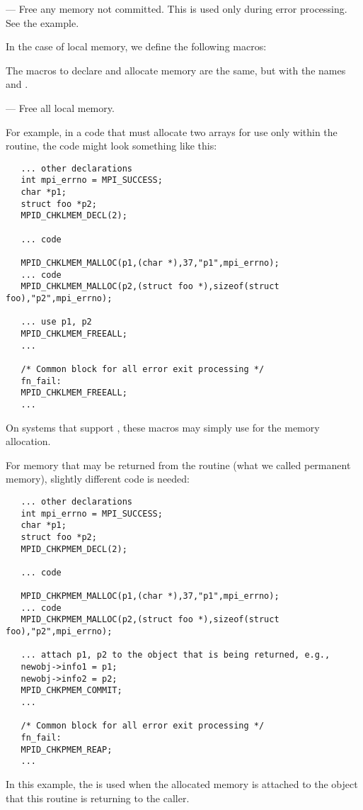\documentclass{article}
\begin{document}
 --- Free any memory not committed.  This is used only
during error processing.  See the example.


In the case of local memory, we define the following macros:

The macros to declare and allocate memory are the same, but with the names
 and . 


 --- Free all local memory.

For example, in a code that must allocate two arrays for use only within the 
routine, the code might look something like this:
\begin{verbatim}
   ... other declarations
   int mpi_errno = MPI_SUCCESS;
   char *p1;  
   struct foo *p2;
   MPID_CHKLMEM_DECL(2);

   ... code

   MPID_CHKLMEM_MALLOC(p1,(char *),37,"p1",mpi_errno);
   ... code
   MPID_CHKLMEM_MALLOC(p2,(struct foo *),sizeof(struct foo),"p2",mpi_errno);

   ... use p1, p2
   MPID_CHKLMEM_FREEALL;
   ...

   /* Common block for all error exit processing */
   fn_fail:
   MPID_CHKLMEM_FREEALL;
   ...
\end{verbatim}
On systems that support , these macros may simply use
 for the memory allocation.

For memory that may be returned from the routine (what we called permanent
memory), slightly different code is needed:
\begin{verbatim}
   ... other declarations
   int mpi_errno = MPI_SUCCESS;
   char *p1;  
   struct foo *p2;
   MPID_CHKPMEM_DECL(2);

   ... code

   MPID_CHKPMEM_MALLOC(p1,(char *),37,"p1",mpi_errno);
   ... code
   MPID_CHKPMEM_MALLOC(p2,(struct foo *),sizeof(struct foo),"p2",mpi_errno);

   ... attach p1, p2 to the object that is being returned, e.g., 
   newobj->info1 = p1;
   newobj->info2 = p2;
   MPID_CHKPMEM_COMMIT;
   ...

   /* Common block for all error exit processing */
   fn_fail:
   MPID_CHKPMEM_REAP;
   ...
\end{verbatim}
In this example, the  is used when the allocated
memory is attached to the object  that this routine is returning
to the caller.  
\end{document}
